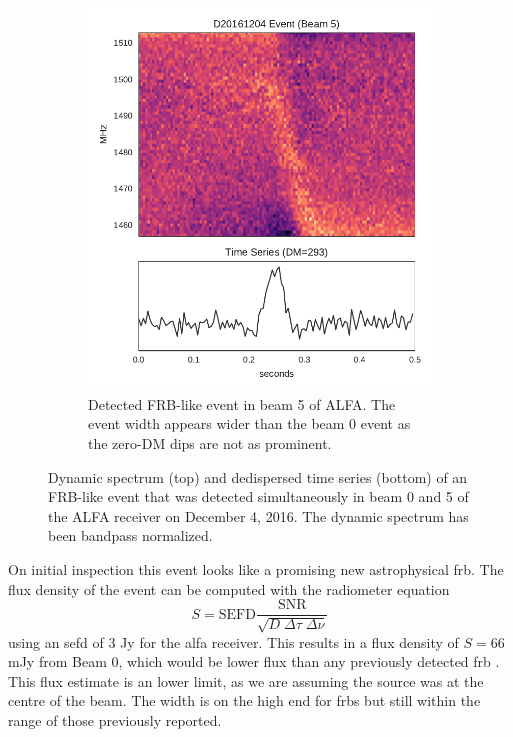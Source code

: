 \documentclass[a4paper,fleqn,usenatbib]{mnras}
\begin{document}
\begin{figure}
\begin{subfigure}[t]{0.45\textwidth}
        \includegraphics[width=1.0\textwidth]{figures/D20161204_buf4_Beam5.pdf}
        \caption{Detected FRB-like event in beam 5 of ALFA. The event width
        appears wider than the beam 0 event as the zero-DM dips are not as
        prominent.
        }
        \label{fig:beam5_dynamic_spec}
    \end{subfigure}
    \caption{
    Dynamic spectrum (top) and dedispersed time series (bottom) of an FRB-like
    event that was detected simultaneously in beam 0 and 5 of the ALFA receiver
    on December 4, 2016. The dynamic spectrum has been bandpass normalized.
    }
    \label{fig:dynamic_spec}
\end{figure}

On initial inspection this event looks like a promising new astrophysical
\gls{frb}. The flux density of the event can be computed with the radiometer
equation
%
$$
S = \textrm{SEFD} \frac{\textrm{SNR}}{\sqrt{D \; \Delta \tau \;
\Delta \nu}}
$$
%
using an \gls{sefd} of 3 Jy for the \gls{alfa} receiver. This results in a flux
density of $S = 66$ mJy from Beam 0, which would be lower flux than any
previously detected \gls{frb} \citep{2016PASA...33...45P}. This flux estimate is
an lower limit, as we are assuming the source was at the centre of the beam. The
width is on the high end for \glspl{frb} but still within the range of those
previously reported.
\end{document}
